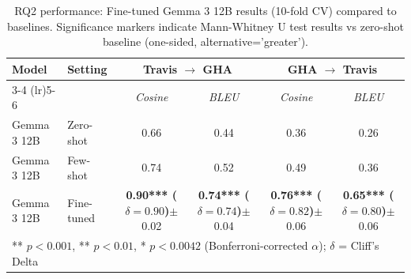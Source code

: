 \begin{table}[t]
\centering
\caption{RQ2 performance: Fine-tuned Gemma 3 12B results (10-fold CV) compared to baselines. Significance markers indicate Mann-Whitney U test results vs zero-shot baseline (one-sided, alternative='greater').}
\label{tab:rq2-performance}
\begin{tabular}{llcccc}
\toprule
\textbf{Model} & \textbf{Setting} &
\multicolumn{2}{c}{\textbf{Travis $\rightarrow$ GHA}} &
\multicolumn{2}{c}{\textbf{GHA $\rightarrow$ Travis}} \\
\cmidrule(lr){3-4} \cmidrule(lr){5-6}
& & \textit{Cosine} & \textit{BLEU} & \textit{Cosine} & \textit{BLEU} \\
\midrule
Gemma 3 12B & Zero-shot & 0.66 & 0.44 & 0.36 & 0.26 \\
Gemma 3 12B & Few-shot & 0.74 & 0.52 & 0.49 & 0.36 \\
\midrule
Gemma 3 12B & Fine-tuned & \textbf{0.90*** ($\delta=0.90$)}$\pm$0.02 & \textbf{0.74*** ($\delta=0.74$)}$\pm$0.04 & \textbf{0.76*** ($\delta=0.82$)}$\pm$0.06 & \textbf{0.65*** ($\delta=0.80$)}$\pm$0.06 \\
\bottomrule
\multicolumn{6}{l}{\footnotesize *** $p < 0.001$, ** $p < 0.01$, * $p < 0.0042$ (Bonferroni-corrected $\alpha$); $\delta$ = Cliff's Delta} \\
\end{tabular}
\end{table}
